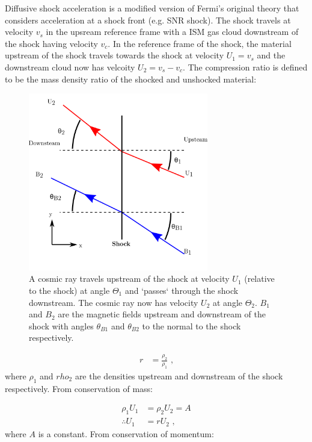 Diffusive shock acceleration is a modified version of Fermi's original theory that considers acceleration at a shock front (e.g. SNR shock). The shock travels at velocity $v_s$ in the upsream reference frame with a ISM gas cloud downstream of the shock having velocity $v_c$. In the reference frame of the shock, the material upstream of the shock travels towards the shock at velocity $U_1=v_s$ and the downstream cloud now has velcoity $U_2=v_s-v_c$. The compression ratio is defined to be the mass density ratio of the shocked and unshocked material:
\begin{figure}
	\centering
	\includegraphics[width=0.7\textwidth]{A3_Diffusive_Shock_Acceleration/Images/shock_dynamics.png}
	\caption{A cosmic ray travels upstream of the shock at velocity $U_1$ (relative to the shock) at angle $\Theta_1$ and `passes` through the shock downstream. The cosmic ray now has velocity $U_2$ at angle $\Theta_2$. $B_1$ and $B_2$ are the magnetic fields upstream and downstream of the shock with angles $\theta_{B1}$ and $\theta_{B2}$ to the normal to the shock respectively.}
	\label{fig:A3_shock_dynamics}
\end{figure}
\begin{equation}
    \begin{aligned}
        r&=\frac{\rho_2}{\rho_1}\text{ ,}
    \end{aligned}
\end{equation}
\noindent where $\rho_1$ and $rho_2$ are the densities upstream and downstream of the shock respectively. From conservation of mass:

\begin{equation}
    \begin{aligned}
        \rho_1U_{1}&=\rho_2U_2=A \\
        \therefore U_{1}&=rU_{2}\text{ ,}
    \end{aligned} \label{eq:A3_velocity_ratios}
\end{equation}
\noindent where $A$ is a constant. From conservation of momentum:

